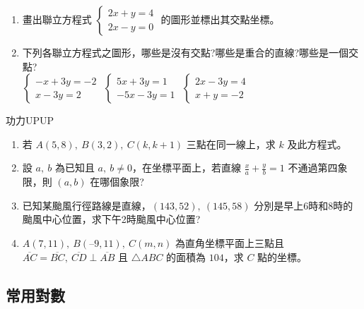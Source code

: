 \documentclass[bwprint,a4paper]{extarticle}
\begin{document}
\vspace{30ex}
\begin{observing}
	\begin{enumerate}
		\item 畫出聯立方程式 
		$\begin{cases}
			2x+y=4\\
			2x-y=0
		\end{cases}$ 的圖形並標出其交點坐標。
		\item 下列各聯立方程式之圖形，哪些是沒有交點?哪些是重合的直線?哪些是一個交點?\\[8pt]
		{$\begin{cases}
			-x+3y=-2\\
			x-3y=2
		\end{cases}$}
		{$\begin{cases}
			5x+3y=1\\
			-5x-3y=1
		\end{cases}$}
		{$\begin{cases}
			2x-3y=4\\
			x+y=-2
		\end{cases}$}
	\end{enumerate}
\end{observing}
\newpage
\begin{customs}{功力UPUP}
	\begin{enumerate}
		\item 若 $A(5,8),\ B(3,2),\ C(k,k+1)$ 三點在同一線上，求 $k$ 及此方程式。
		\item 設 $a,\ b$ 為已知且 $a,\ b\neq0$，在坐標平面上，若直線 $ \frac{x}{a}+\frac{y}{b}=1$ 不通過第四象限，則 $(a,b)$ 在哪個象限?
		\item 已知某颱風行徑路線是直線，$(143,52),\ (145,58)$ 分別是早上6時和8時的颱風中心位置，求下午2時颱風中心位置?
		\item $A(7,11),\ B(–9,11),\ C(m, n)$ 為直角坐標平面上三點且 $\overline{AC}=\overline{BC},\ \overline{CD}\perp\overline{AB}$ 且 $\bigtriangleup ABC$ 的面積為 $104$，求 $C$ 點的坐標。
	\end{enumerate}
\end{customs}


\subsection{常用對數}
\end{document}
